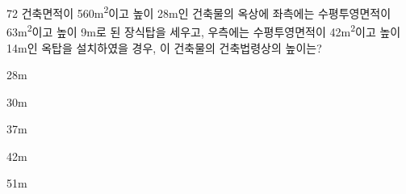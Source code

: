 \begin{question}{72}
건축면적이 560m\textsuperscript{2}이고 높이 28m인 건축물의 옥상에 좌측에는 수평투영면적이 63m\textsuperscript{2}이고 높이 9m로 된 장식탑을 세우고, 우측에는 수평투영면적이 42m\textsuperscript{2}이고 높이 14m인 옥탑을 설치하였을 경우, 이 건축물의 건축법령상의 높이는?
\begin{choices}
  \item 28m
  \item 30m
  \item 37m
  \item 42m
  \item 51m
\end{choices}
\end{question}
